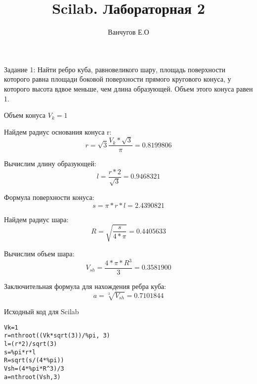 \documentclass{article}
\title{Scilab. Лабораторная 2}
\author{Ванчугов Е.О }
\begin{document}
\maketitle
{\Large Задание 1}: Найти ребро куба, равновеликого шару, площадь поверхности которого равна площади боковой поверхности прямого кругового конуса, у которого высота вдвое меньше, чем длина образующей. Объем этого конуса равен 1.

Объем конуса $V_k = 1$

Найдем радиус основания конуса r:
$$r=\sqrt{3}{\frac{V_k*\sqrt3}{\pi}} = 0.8199806 $$

Вычислим длину образующей:
$$l=\frac{r*2}{\sqrt3} = 0.9468321 $$

Формула поверхности конуса:
$$s=\pi*r*l = 2.4390821 $$

Найдем радиус шара:
$$R=\sqrt{\frac{s}{4*\pi}} = 0.4405633$$

Вычислим объем шара:
$$V_{sh}=\frac{4*\pi*R^3}{3} = 0.3581900$$

Заключительная формула для нахождения ребра куба:
$$a=\sqrt[3]{V_{sh}} = 0.7101844$$

Исходный код для Scilab
\begin{verbatim}
Vk=1
r=nthroot((Vk*sqrt(3))/%pi, 3)
l=(r*2)/sqrt(3)
s=%pi*r*l
R=sqrt(s/(4*%pi))
Vsh=(4*%pi*R^3)/3
a=nthroot(Vsh,3)
\end{verbatim}
\end{document}
